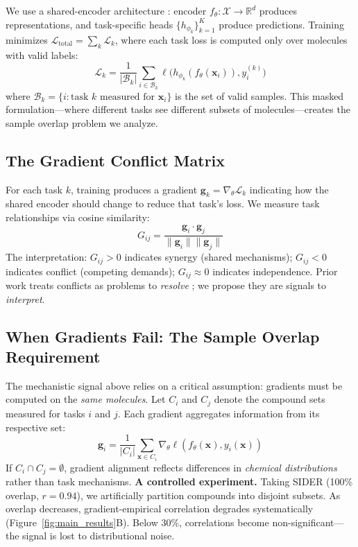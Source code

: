 \documentclass[sigconf,nonacm]{acmart}
\newcommand{\loss}{\mathcal{L}}
\begin{document}
We use a shared-encoder architecture \cite{caruana1997multitask, ruder2017overview}: encoder $f_\theta: \mathcal{X} \rightarrow \mathbb{R}^d$ produces representations, and task-specific heads $\{h_{\phi_k}\}_{k=1}^K$ produce predictions. Training minimizes $\loss_{\text{total}} = \sum_{k} \loss_k$, where each task loss is computed only over molecules with valid labels:
\begin{equation}
    \loss_k = \frac{1}{|\mathcal{B}_k|} \sum_{i \in \mathcal{B}_k} \ell\bigl(h_{\phi_k}(f_\theta(\mathbf{x}_i)), y_i^{(k)}\bigr)
\end{equation}%
where $\mathcal{B}_k = \{i : \text{task } k \text{ measured for } \mathbf{x}_i\}$ is the set of valid samples. This masked formulation---where different tasks see different subsets of molecules---creates the sample overlap problem we analyze.

\subsection{The Gradient Conflict Matrix}

For each task $k$, training produces a gradient $\mathbf{g}_k = \nabla_\theta \loss_k$ indicating how the shared encoder should change to reduce that task's loss. We measure task relationships via cosine similarity:
\begin{equation}
    G_{ij} = \frac{\mathbf{g}_i \cdot \mathbf{g}_j}{\|\mathbf{g}_i\| \|\mathbf{g}_j\|}
\end{equation}%
The interpretation: $G_{ij} > 0$ indicates synergy (shared mechanisms); $G_{ij} < 0$ indicates conflict (competing demands); $G_{ij} \approx 0$ indicates independence. Prior work treats conflicts as problems to \textit{resolve} \cite{yu2020gradient, chen2018gradnorm}; we propose they are signals to \textit{interpret}.

\subsection{When Gradients Fail: The Sample Overlap Requirement}

The mechanistic signal above relies on a critical assumption: gradients must be computed on the \textit{same molecules}. Let $C_i$ and $C_j$ denote the compound sets measured for tasks $i$ and $j$. Each gradient aggregates information from its respective set:
\begin{equation}
    \mathbf{g}_i = \frac{1}{|C_i|} \sum_{\mathbf{x} \in C_i} \nabla_\theta \ell(f_\theta(\mathbf{x}), y_i(\mathbf{x}))
\end{equation}%
If $C_i \cap C_j = \emptyset$, gradient alignment reflects differences in \textit{chemical distributions} rather than task mechanisms.
\textbf{A controlled experiment.} Taking SIDER (100\% overlap, $r = 0.94$), we artificially partition compounds into disjoint subsets. As overlap decreases, gradient-empirical correlation degrades systematically (Figure~\ref{fig:main_results}B). Below 30\%, correlations become non-significant---the signal is lost to distributional noise.
\end{document}
